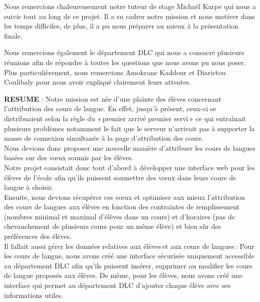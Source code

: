 \documentclass[12pt]{article}
\begin{document}
\begin{center}
	    \medskip
	    
	\begin{flushleft}
    Nous remercions chaleureusement notre tuteur de stage Michaël Karpe qui nous a suivis tout au long de ce projet. Il a su cadrer notre mission et nous motiver dans les temps difficiles, de plus, il a pu nous préparer au mieux à la présentation finale. 

    Nous remercions également le département DLC qui nous a consacré plusieurs réunions afin de répondre à toutes les questions que nous avons pu nous poser. Plus particulièrement, nous remercions Amokrane Kaddour et Diarietou Coulibaly pour nous avoir expliqué clairement leurs attentes. 
  \end{flushleft}
		
		\newpage
		
		\begin{minipage}{16cm}
			{\normalsize
				\parindent=0pt
				{{\bf RESUME} : Notre mission est née d’une plainte des élèves concernant l’attribution des cours de langue. En effet, jusqu’à présent, ceux-ci se distribuaient selon la règle du « premier arrivé premier servi » ce qui entraînait plusieurs problèmes notamment le fait que le serveur n’arrivait pas à supporter la masse de connexion simultanée à la page d’attribution des cours. \\

        Nous devions donc proposer une nouvelle manière d’attribuer les cours de langues basées sur des vœux soumis par les élèves. \\
        
        Notre projet consistait donc tout d’abord à développer une interface web pour les élèves de l’école afin qu’ils puissent soumettre des vœux dans leurs cours de langue à choisir.  \\
        
        Ensuite, nous devions récupérer ces vœux et optimiser aux mieux l’attribution des cours de langues aux élèves en fonction des contraintes de remplissement (nombres minimal et maximal d’élèves dans un cours) et d’horaires (pas de chevauchement de plusieurs cours pour un même élève) et bien sûr des préférences des élèves. \\
        
        Il fallait aussi gérer les données relatives aux élèves et aux cours de langues : Pour les cours de langue, nous avons créé une interface sécurisée uniquement accessible au département DLC afin qu’ils puissent insérer, supprimer ou modifier les cours de langue proposés aux élèves. De même, pour les élèves, nous avons créé une interface qui permet au département DLC d’ajouter chaque élève avec ses informations utiles. \\
        
}}
\end{minipage}
\end{center}
\end{document}
